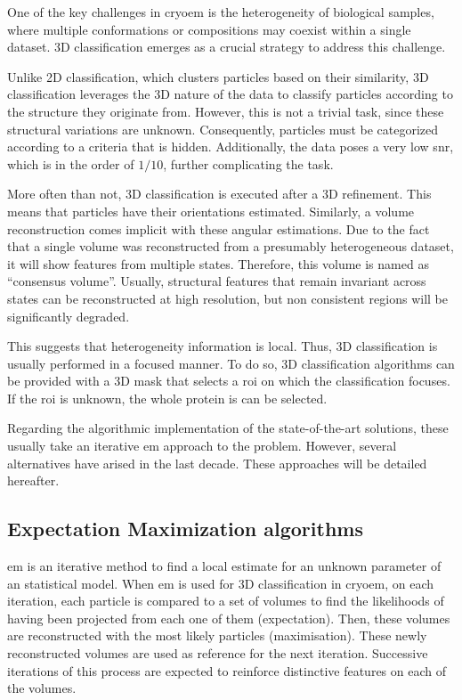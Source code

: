 \documentclass[../main.tex]{subfiles}
\begin{document}
One of the key challenges in \gls{cryoem} is the heterogeneity of biological samples, where multiple conformations or compositions may coexist within a single dataset. 3D classification emerges as a crucial strategy to address this challenge.

Unlike 2D classification, which clusters particles based on their similarity, 3D classification leverages the 3D nature of the data to classify particles according to the structure they originate from. However, this is not a trivial task, since these structural variations are unknown. Consequently, particles must be categorized according to a criteria that is hidden. Additionally, the data poses a very low \gls{snr}, which is in the order of $1/10$, further complicating the task\cite{nogales2015}.

More often than not, 3D classification is executed after a 3D refinement. This means that particles have their orientations estimated. Similarly, a volume reconstruction comes implicit with these angular estimations. Due to the fact that a single volume was reconstructed from a presumably heterogeneous dataset, it will show features from multiple states. Therefore, this volume is named as ``consensus volume''. Usually, structural features that remain invariant across states can be reconstructed at high resolution, but non consistent regions will be significantly degraded\cite{herreros2021}.

This suggests that heterogeneity information is local. Thus, 3D classification is usually performed in a focused manner. To do so, 3D classification algorithms can be provided with a 3D mask that selects a \gls{roi} on which the classification focuses. If the \gls{roi} is unknown, the whole protein is can be selected.

Regarding the algorithmic implementation of the state-of-the-art solutions, these usually take an iterative \gls{em} approach to the problem. However, several alternatives have arised in the last decade. These approaches will be detailed hereafter.

\subsection{Expectation Maximization algorithms}
\Gls{em} is an iterative method to find a local estimate for an unknown parameter of an statistical model\cite{meng1997}. When \gls{em} is used for 3D classification in \gls{cryoem}, on each iteration, each particle is compared to a set of volumes to find the likelihoods of having been projected from each one of them (expectation). Then, these volumes are reconstructed with the most likely particles (maximisation). These newly reconstructed volumes are used as reference for the next iteration. Successive iterations of this process are expected to reinforce distinctive features on each of the volumes\cite{cryosparc}.
\end{document}
